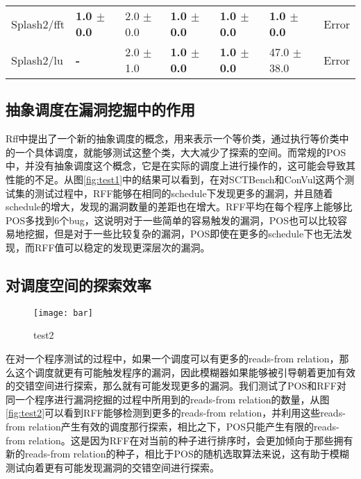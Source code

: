 \begin{table}
\begin{spacing}{1.5}
\begin{tabular}{lllllll}
Splash2/fft & \textbf{ 1.0 $\pm$ 0.0 } & 2.0 $\pm$ 0.0 & \textbf{ 1.0 $\pm$ 0.0 } & \textbf{ 1.0 $\pm$ 0.0 } & \textbf{ 1.0 $\pm$ 0.0 } & Error \\
Splash2/lu & \textbf{ - } & 2.0 $\pm$ 1.0 & \textbf{ 1.0 $\pm$ 0.0 } & \textbf{ 1.0 $\pm$ 0.0 } & 47.0 $\pm$ 38.0 & Error \\
\bottomrule
\end{tabular}
\end{spacing}
\end{table}


\subsection{抽象调度在漏洞挖掘中的作用}

Rff中提出了一个新的抽象调度的概念，用来表示一个等价类，通过执行等价类中的一个具体调度，就能够测试这整个类，大大减少了探索的空间。而常规的POS中，并没有抽象调度这个概念，它是在实际的调度上进行操作的，这可能会导致其性能的不足。从图\autoref{fig:test1}中的结果可以看到，在对SCTBench和ConVul这两个测试集的测试过程中，RFF能够在相同的schedule下发现更多的漏洞，并且随着schedule的增大，发现的漏洞数量的差距也在增大。RFF平均在每个程序上能够比POS多找到6个bug，这说明对于一些简单的容易触发的漏洞，POS也可以比较容易地挖掘，但是对于一些比较复杂的漏洞，POS即使在更多的schedule下也无法发现，而RFF值可以稳定的发现更深层次的漏洞。

\subsection{对调度空间的探索效率}

\begin{figure}[ht]
    \centering
    \texttt{[image: bar]}
    \caption{\label{fig:test2}test2}
\end{figure}

在对一个程序测试的过程中，如果一个调度可以有更多的reads-from relation，那么这个调度就更有可能触发程序的漏洞，因此模糊器如果能够被引导朝着更加有效的交错空间进行探索，那么就有可能发现更多的漏洞。我们测试了POS和RFF对同一个程序进行漏洞挖掘的过程中所用到的reads-from relation的数量，从图\autoref{fig:test2}可以看到RFF能够检测到更多的reads-from relation，并利用这些reads-from relation产生有效的调度那行探索，相比之下，POS只能产生有限的reads-from relation。这是因为RFF在对当前的种子进行排序时，会更加倾向于那些拥有新的reads-from relation的种子，相比于POS的随机选取算法来说，这有助于模糊测试向着更有可能发现漏洞的交错空间进行探索。


